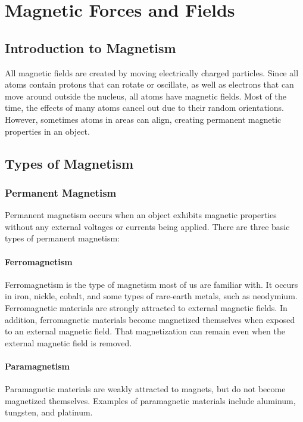 \chapter{Magnetic Forces and Fields} \label{chap:MagneticForcesandFields}
	\section{Introduction to Magnetism} 
		All magnetic fields are created by moving electrically charged particles.  Since all atoms contain protons that can rotate or oscillate, as well as electrons that can move around outside the nucleus, all atoms have magnetic fields.  Most of the time, the effects of many atoms cancel out due to their random orientations.  However, sometimes atoms in areas can align, creating permanent magnetic properties in an object. 

	\section{Types of Magnetism} 
		\subsection{Permanent Magnetism}
		Permanent magnetism occurs when an object exhibits magnetic properties without any external voltages or currents being applied.  There are three basic types of permanent magnetism: 
			\subsubsection{Ferromagnetism}  Ferromagnetism is the type of magnetism most of us are familiar with.  It occurs in iron, nickle, cobalt, and some types of rare-earth metals, such as neodymium.  Ferromagnetic materials are strongly attracted to external magnetic fields.  In addition, ferromagnetic materials become magnetized themselves when exposed to an external magnetic field.  That magnetization can remain even when the external magnetic field is removed.  
			
			
			\subsubsection{Paramagnetism}  Paramagnetic materials are weakly attracted to magnets, but do not become magnetized themselves.  Examples of paramagnetic materials include aluminum, tungsten, and platinum.  


